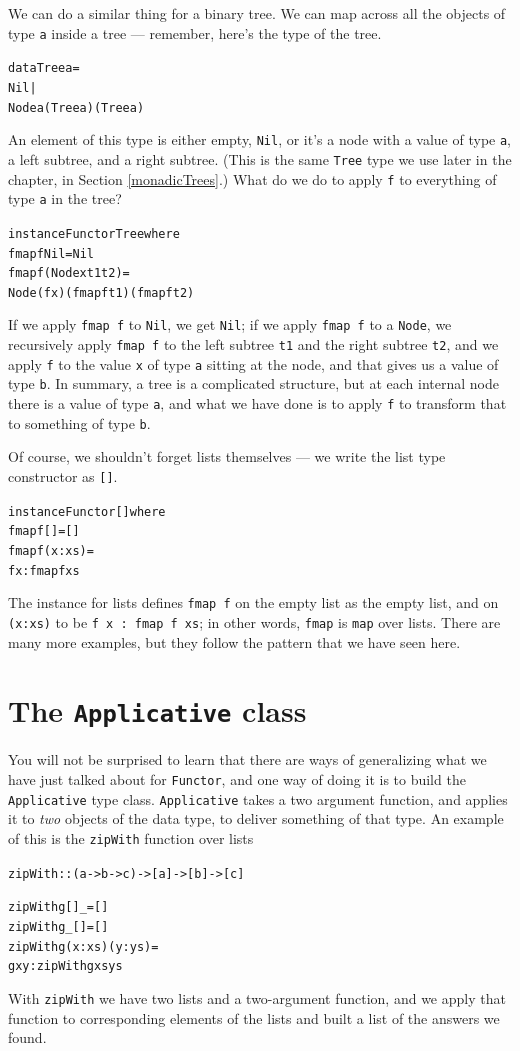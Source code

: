 We can do a similar thing for a binary tree. We can map across all the objects of type \texttt{a} inside a tree — remember, here's the type of the tree.
\begin{alltt}
data Tree a =
   Nil |
   Node a (Tree a) (Tree a)
\end{alltt}
An element of this type is either empty, \texttt{Nil}, or it's a node with a value of type \texttt{a}, a left subtree, and a right subtree. (This is the same \texttt{Tree} type we use later in the chapter, in Section \ref{monadicTrees}.) What do we do to apply \texttt{f} to everything of type \texttt{a} in the tree?
\begin{alltt}
instance Functor Tree where
  fmap f Nil  = Nil
  fmap f (Node x t1 t2) =
       Node (f x) (fmap f t1) (fmap f t2)
\end{alltt}
If we apply \texttt{fmap f} to \texttt{Nil}, we get \texttt{Nil}; if we apply \texttt{fmap f} to a \texttt{Node}, we recursively apply \texttt{fmap f} to the left subtree \texttt{t1} and the right subtree \texttt{t2}, and we apply \texttt{f} to the value \texttt{x} of type \texttt{a} sitting at the node, and that gives us a value of type \texttt{b}. In summary, a tree is a complicated structure, but at each internal node there is a value of type \texttt{a}, and what we have done is to apply \texttt{f} to transform that to something of type \texttt{b}.

Of course, we shouldn't forget lists themselves — we write the list type constructor as \texttt{[]}.
\begin{alltt}
instance Functor [] where
  fmap f []  = []
  fmap f (x:xs) = 
       f x : fmap f xs
\end{alltt}
The instance for lists defines \texttt{fmap f} on the empty list as the empty list, and on \texttt{(x:xs)} to be \texttt{f x : fmap f xs}; in other words, \texttt{fmap} is \texttt{map} over lists. There are many more examples, but they follow the pattern that we have seen here.

\section{The \texttt{Applicative} class}

You will not be surprised to learn that there are ways of generalizing what we have just talked about for \texttt{Functor}, and one way of doing it is to build the \texttt{Applicative} type class. \texttt{Applicative} takes a two argument function, and applies it to \emph{two} objects of the data type, to deliver something of that type. An example of this is the \texttt{zipWith} function over lists
\begin{alltt}
zipWith :: (a -> b -> c) -> [a] -> [b] -> [c]

zipWith g [] _ = []
zipWith g _ [] = []
zipWith g (x:xs) (y:ys) =
  g x y : zipWith g xs ys
\end{alltt}
With \texttt{zipWith} we have two lists and a two-argument function, and we apply that function to corresponding elements of the lists and built a list of the answers we found.

